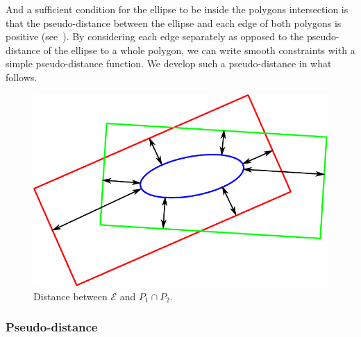 And a sufficient condition for the ellipse to be inside the polygons intersection is that the pseudo-distance between the ellipse and each edge of both polygons is positive (see~).
By considering each edge separately as opposed to the pseudo-distance of the ellipse to a whole polygon, we can write smooth constraints with a simple pseudo-distance function.
We develop such a pseudo-distance in what follows.
%
\begin{figure}[!htb]
  \centering
  \includegraphics[width=0.4\columnwidth]{distance.pdf}
  \caption{Distance between $\mathcal{E}$ and $P_1 \cap P_2$.}
\label{fig:distance}
\end{figure}

\subsubsection{Pseudo-distance}
\label{subsubsec:formulation}

